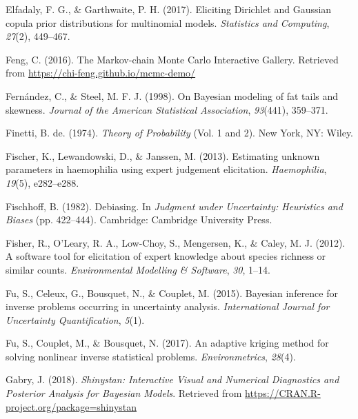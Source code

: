 \documentclass[openright,titlepage,12pt,a4paper]{book}
\begin{document}
\leavevmode\hypertarget{ref-elfadaly_eliciting_2017}{}%
Elfadaly, F. G., \& Garthwaite, P. H. (2017). Eliciting Dirichlet and Gaussian copula prior distributions for multinomial models. \emph{Statistics and Computing}, \emph{27}(2), 449--467.

\leavevmode\hypertarget{ref-feng_markov-chain_2016}{}%
Feng, C. (2016). The Markov-chain Monte Carlo Interactive Gallery. Retrieved from \url{https://chi-feng.github.io/mcmc-demo/}

\leavevmode\hypertarget{ref-fernandez_bayesian_1998}{}%
Fernández, C., \& Steel, M. F. J. (1998). On Bayesian modeling of fat tails and skewness. \emph{Journal of the American Statistical Association}, \emph{93}(441), 359--371.

\leavevmode\hypertarget{ref-de_finetti_theory_1974}{}%
Finetti, B. de. (1974). \emph{Theory of Probability} (Vol. 1 and 2). New York, NY: Wiley.

\leavevmode\hypertarget{ref-fischer_estimating_2013}{}%
Fischer, K., Lewandowski, D., \& Janssen, M. (2013). Estimating unknown parameters in haemophilia using expert judgement elicitation. \emph{Haemophilia}, \emph{19}(5), e282--e288.

\leavevmode\hypertarget{ref-fischhoff_debiasing_1982}{}%
Fischhoff, B. (1982). Debiasing. In \emph{Judgment under Uncertainty: Heuristics and Biases} (pp. 422--444). Cambridge: Cambridge University Press.

\leavevmode\hypertarget{ref-fisher_software_2012}{}%
Fisher, R., O'Leary, R. A., Low-Choy, S., Mengersen, K., \& Caley, M. J. (2012). A software tool for elicitation of expert knowledge about species richness or similar counts. \emph{Environmental Modelling \& Software}, \emph{30}, 1--14.

\leavevmode\hypertarget{ref-fu_bayesian_2015}{}%
Fu, S., Celeux, G., Bousquet, N., \& Couplet, M. (2015). Bayesian inference for inverse problems occurring in uncertainty analysis. \emph{International Journal for Uncertainty Quantification}, \emph{5}(1).

\leavevmode\hypertarget{ref-fu_adaptive_2017}{}%
Fu, S., Couplet, M., \& Bousquet, N. (2017). An adaptive kriging method for solving nonlinear inverse statistical problems. \emph{Environmetrics}, \emph{28}(4).

\leavevmode\hypertarget{ref-gabry_shinystan:_2018}{}%
Gabry, J. (2018). \emph{Shinystan: Interactive Visual and Numerical Diagnostics and Posterior Analysis for Bayesian Models}. Retrieved from \url{https://CRAN.R-project.org/package=shinystan}
\end{document}
